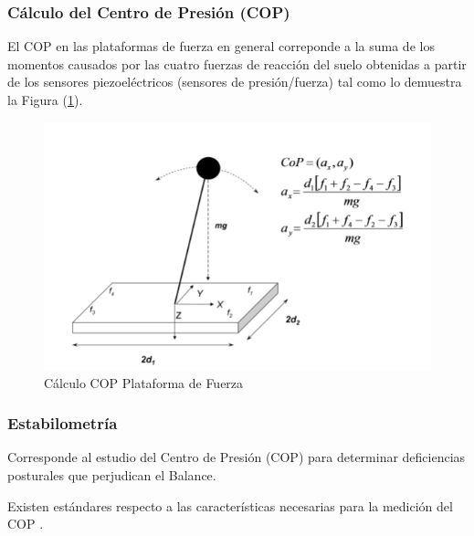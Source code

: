 \documentclass[12pt,a4paper]{article}
\begin{document}
\subsubsection{Cálculo del Centro de Presión (COP)}
El COP en las plataformas de fuerza en general correponde a la suma de los momentos causados por las cuatro fuerzas de reacción del suelo obtenidas a partir de los sensores piezoeléctricos (sensores de presión/fuerza) tal como lo demuestra la Figura (\ref{fig:calculoCOP}).

\begin{figure}[H]
	\centering
	\includegraphics[width=0.65\linewidth]{images/calculoCOP}
	\caption{Cálculo COP Plataforma de Fuerza}
	\label{fig:calculoCOP}
\end{figure}

\subsubsection{Estabilometría}
Corresponde al estudio del Centro de Presión (COP) para determinar deficiencias posturales que perjudican el Balance.

Existen estándares respecto a las características necesarias para la medición del COP \cite{scoppa_clinical_2013}.
\end{document}
